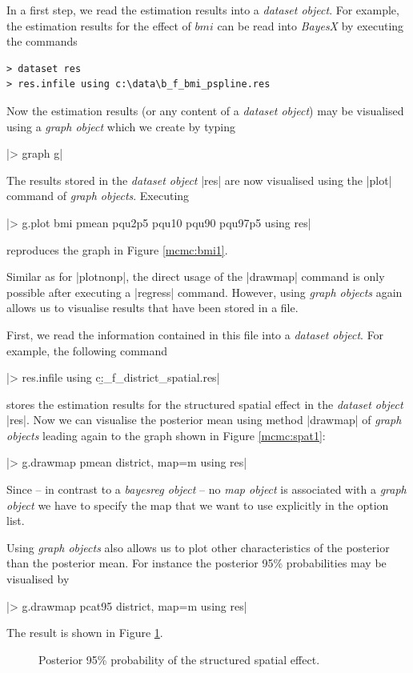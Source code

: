 In a first step, we read the estimation results into a {\it dataset object}. For example, the estimation results for the effect
of $\mathit{bmi}$ can be read into {\it BayesX} by executing the commands

\begin{verbatim}
> dataset res
> res.infile using c:\data\b_f_bmi_pspline.res
\end{verbatim}

Now the estimation results (or any content of a {\it dataset object}) may be visualised using a {\it graph object} which we
create by typing

|> graph g|

The results stored in the {\it dataset object} |res| are now visualised using the |plot| command of {\it graph objects}.
Executing

|> g.plot bmi pmean pqu2p5 pqu10 pqu90 pqu97p5 using res|

reproduces the graph in Figure \ref{mcmc:bmi1}.

Similar as for |plotnonp|, the direct usage of the |drawmap| command is only possible after executing a |regress| command.
However, using {\it graph objects} again allows us to visualise results that have been stored in a file.

First, we read the information contained in this file into a {\it dataset object}. For example, the following command

|> res.infile using c:\data\b_f_district_spatial.res|

stores the estimation results for the structured spatial effect in the {\it dataset object} |res|. Now we can visualise the
posterior mean using method |drawmap| of {\it graph objects} leading again to the graph shown in Figure \ref{mcmc:spat1}:

|> g.drawmap pmean district, map=m using res|

Since -- in contrast to a {\it bayesreg object} -- no {\it map object} is associated with a {\it graph object} we have to
specify the map that we want to use explicitly in the option list.

Using {\it graph objects} also allows us to plot other characteristics of the posterior than the posterior mean. For instance
the posterior 95\% probabilities may be visualised by

|> g.drawmap pcat95 district, map=m using res|

The result is shown in Figure \ref{mcmc:spat2}.

\begin{figure}[ht]
\begin{center}
{\it\caption{Posterior 95\% probability of the structured spatial
effect.\label{mcmc:spat2}}}
\end{center}
\end{figure}

